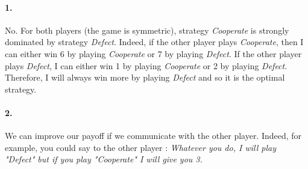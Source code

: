 \paragraph{1.} No. For both players (the game is symmetric), strategy \textit{Cooperate} is strongly dominated by strategy \textit{Defect}. Indeed, if the other player plays \textit{Cooperate}, then I can either win 6 by playing \textit{Cooperate} or 7 by playing \textit{Defect}. If the other player plays \textit{Defect}, I can either win 1 by playing \textit{Cooperate} or 2 by playing \textit{Defect}. Therefore, I will always win more by playing \textit{Defect} and so it is the optimal strategy.

\paragraph{2.} We can improve our payoff if we communicate with the other player. Indeed, for example, you could say to the other player :
\emph{Whatever you do, I will play "Defect" but if you play "Cooperate" I will give you 3.}